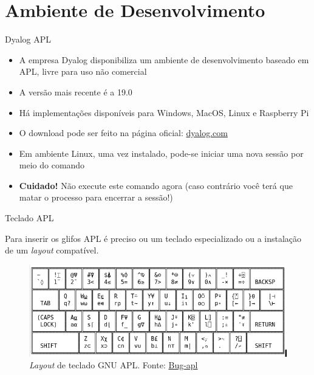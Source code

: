 \section{Ambiente de Desenvolvimento}

\begin{frame}[fragile]{Dyalog APL}

    \begin{itemize}
        \item A empresa Dyalog disponibiliza um ambiente de desenvolvimento baseado em APL, livre para uso não comercial
        \pause

        \item A versão mais recente é a 19.0
        \pause

        \item Há implementações disponíveis para Windows, MacOS, Linux e Raspberry Pi
        \pause
 
        \item O download pode ser feito na página oficial: \href{dyalog.com}{dyalog.com}
        \pause

        \item Em ambiente Linux, uma vez instalado, pode-se iniciar uma nova sessão por meio do
            comando

        \pause

        \item \textbf{Cuidado!} Não execute este comando agora (caso contrário você terá que
            matar o processo para encerrar a sessão!)

    \end{itemize}

\end{frame}

\begin{frame}[fragile]{Teclado APL}

    Para inserir os glifos APL é preciso ou um teclado especializado ou a instalação de um \textit{layout} compatível.
        \pause

    \begin{figure}
        \centering
        \includegraphics[scale=0.5]{figs/keyboard.png}

        \caption{\textit{Layout} de teclado GNU APL. Fonte: \href{https://lists.gnu.org/archive/html/bug-apl/2014-06/msg00261.html}{Bug-apl}}
    \end{figure}

\end{frame}

